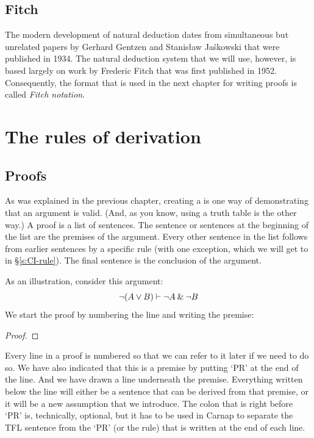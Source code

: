 \section{Fitch} 

The modern development of natural deduction dates from simultaneous but unrelated papers by Gerhard Gentzen and Stanisław Jaśkowski that were published in 1934. The natural deduction system that we will use, however, is based largely on work by Frederic Fitch that was first published in 1952. Consequently, the format that is used in the next chapter for writing proofs is called \textit{Fitch notation}.



\chapter{The rules of derivation}\label{s:BasicTFL}

\section{Proofs}\label{intro-proofs}

As was explained in the previous chapter, creating a  is one way of demonstrating that an argument is valid. (And, as you know, using a truth table is the  other way.) A proof is a list of sentences. The sentence or sentences at the beginning of the list are the premises of the argument. Every other sentence in the list follows from earlier sentences by a specific rule (with one exception, which we will get to in \S \ref{s:CI-rule}). The final sentence is the conclusion of the argument.

As an illustration, consider this argument:
	$${\neg} (A \vee B) \vdash {\neg} A \mathbin{\&} {\neg} B$$
We start the proof by numbering the line and writing the premise:
\begin{proof}
	 \pr{}
\end{proof}
Every line in a proof is numbered so that we can refer to it later if we need to do so. We have also indicated that this is a premise by putting `PR' at the end of the line. And we have drawn a line underneath the premise. Everything written below the line will either be a sentence that can be derived from that premise, or it will be a new assumption that we introduce. The colon that is right before `PR' is, technically, optional, but it has to be used in Carnap to separate the TFL sentence from the `PR' (or the rule) that is written at the end of each line.


